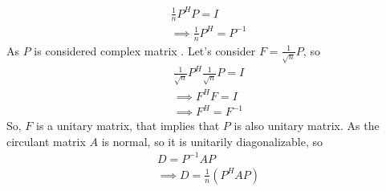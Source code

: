 \documentclass[journal,12pt,twocolumn]{IEEEtran}
\renewcommand\thesection{\arabic{section}}
\begin{document}
\begin{align}
\frac{1}{n}P^H P=I\\
\implies \frac{1}{n}P^H = P^{-1}
\end{align}  
As $P$ is considered complex matrix .
Let's consider $F = \frac{1}{\sqrt{n}}P$, so 
\begin{align}
\frac{1}{\sqrt{n}}P^H \frac{1}{\sqrt{n}}P=I\\
\implies F^H F = I\\
\implies F^H = F^{-1}
\end{align}
So, $F$ is a unitary matrix, that implies that $P$ is also unitary matrix.
As the circulant matrix $A$ is normal, so it is unitarily diagonalizable, so
\begin{align}
D = P^{-1} A P\\
\implies D = \frac{1}{n}(P^H A P)
\end{align}
%
\end{document}
